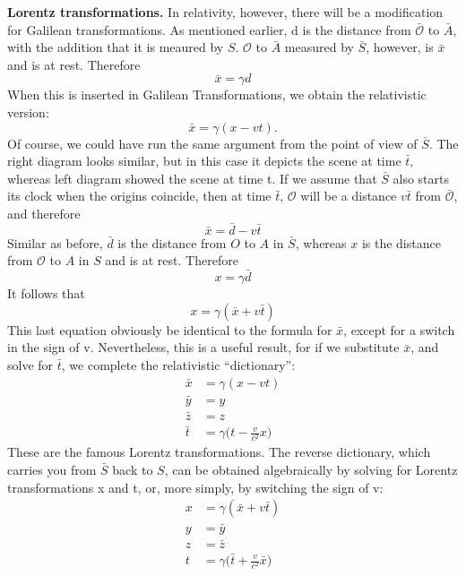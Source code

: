 \documentclass[../../../main.tex]{subfiles}
\begin{document}
\textbf{Lorentz transformations.} In relativity, however, there will be a modification for Galilean transformations. As mentioned earlier, d is the distance from $\bar{\mathcal{O}}$ to $\bar{A}$, with the addition that it is meaured by $S$. $ {\mathcal{O}}$ to $\bar{A}$ measured by $\bar{S}$, however, is $\bar{x}$ and is at rest. Therefore
\begin{equation*}
    \bar{x}=\gamma d
\end{equation*}
When this is inserted in Galilean Transformations, we obtain the relativistic version:
\begin{equation*}
    \bar{x} = \gamma (x - vt).
\end{equation*}
Of course, we could have run the same argument from the point of view of $\bar{S}$. The right diagram looks similar, but in this case it depicts the scene at time $\bar{t}$, whereas left diagram showed the scene at time t. If we assume that $\bar{S}$ also starts its clock when the origins coincide, then at time $\bar{t}$, $\mathcal{O}$ will be a distance $v\bar{t}$ from $\bar{\mathcal{O}}$, and therefore
\begin{equation*}
    \bar{x}=\bar{d}-v\bar{t}
\end{equation*}
Similar as before, $\bar{d}$ is the distance from $O$ to $A$ in $\bar{S}$, whereas $x$ is the distance from $\mathcal{O}$ to $A$ in $S$ and is at rest. Therefore
\begin{equation*}
    x=\gamma\bar{d}
\end{equation*}
It follows that
\begin{equation*}
    x=\gamma(\bar{x}+v\bar{t})
\end{equation*}
This last equation obviously be identical to the formula for $\bar{x}$, except for a switch in the sign of v. Nevertheless, this is a useful result, for if we substitute $\bar{x}$, and solve for $\bar{t}$, we complete the relativistic “dictionary”:
\begin{align*}
    \bar{x} &= \gamma (x - vt)\\
    \bar{y} &= y\\
    \bar{z} &= z\\
    \bar{t}&=\gamma\biggl(t-\frac{v}{c^2}x\biggr)
\end{align*}
These are the famous Lorentz transformations. The reverse dictionary, which carries you from $\bar{S}$ back to $S$, can be obtained algebraically by solving for Lorentz transformations x and t, or, more simply, by switching the sign of v:
\begin{align*}
    x &= \gamma (\bar{x}+ v\bar{t})\\
    y &= \bar{y}\\
    z &= \bar{z}\\
    t&=\gamma\biggl(\bar{t}+ \frac{v}{c^2}\bar{x}\biggr)
\end{align*}
\end{document}
